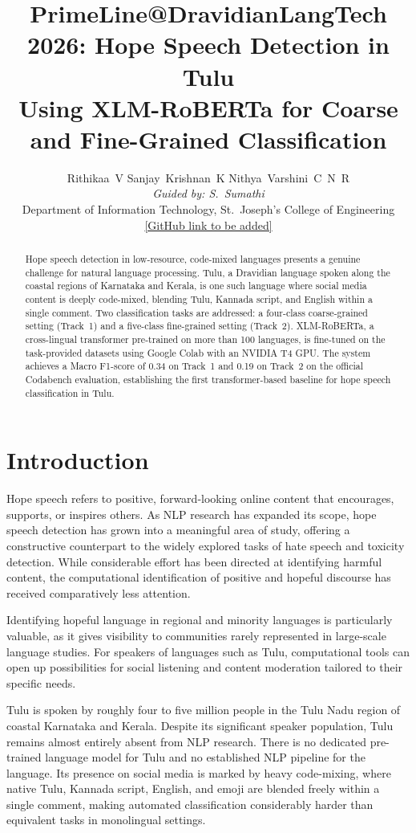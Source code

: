 \documentclass[11pt]{article}
\title{PrimeLine@DravidianLangTech 2026: Hope Speech Detection in Tulu\\
Using XLM-RoBERTa for Coarse and Fine-Grained Classification}
\author{Rithikaa~V \quad Sanjay~Krishnan~K \quad Nithya~Varshini~C~N~R \\
  \textit{Guided by: S.~Sumathi} \\
  Department of Information Technology, St.~Joseph's College of Engineering \\
  \url{[GitHub link to be added]}
}
\begin{document}
\maketitle

\begin{abstract}
Hope speech detection in low-resource, code-mixed languages presents a genuine
challenge for natural language processing. Tulu, a Dravidian language spoken along
the coastal regions of Karnataka and Kerala, is one such language where social media
content is deeply code-mixed, blending Tulu, Kannada script, and English within a
single comment. Two classification tasks are addressed: a four-class coarse-grained
setting (Track~1) and a five-class fine-grained setting (Track~2). XLM-RoBERTa,
a cross-lingual transformer pre-trained on more than 100 languages, is fine-tuned
on the task-provided datasets using Google Colab with an NVIDIA T4 GPU. The system
achieves a Macro F1-score of 0.34 on Track~1 and 0.19 on Track~2 on the official
Codabench evaluation, establishing the first transformer-based baseline for hope
speech classification in Tulu.
\end{abstract}

\section{Introduction}

Hope speech refers to positive, forward-looking online content that encourages,
supports, or inspires others. As NLP research has expanded its scope, hope speech
detection has grown into a meaningful area of study, offering a constructive
counterpart to the widely explored tasks of hate speech and toxicity detection.
While considerable effort has been directed at identifying harmful content, the
computational identification of positive and hopeful discourse has received
comparatively less attention.

Identifying hopeful language in regional and minority languages is particularly
valuable, as it gives visibility to communities rarely represented in large-scale
language studies. For speakers of languages such as Tulu, computational tools can
open up possibilities for social listening and content moderation tailored to their
specific needs.

Tulu is spoken by roughly four to five million people in the Tulu Nadu region of
coastal Karnataka and Kerala. Despite its significant speaker population, Tulu remains
almost entirely absent from NLP research. There is no dedicated pre-trained language
model for Tulu and no established NLP pipeline for the language. Its presence on
social media is marked by heavy code-mixing, where native Tulu, Kannada script,
English, and emoji are blended freely within a single comment, making automated
classification considerably harder than equivalent tasks in monolingual settings.
\end{document}
